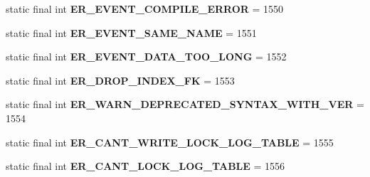 \begin{DoxyCompactItemize}
\item 
\mbox{\label{classcom_1_1mysql_1_1jdbc_1_1_mysql_error_numbers_a511e0dc3db2c2b5da860aba48781529d}} 
static final int {\bfseries E\+R\+\_\+\+E\+V\+E\+N\+T\+\_\+\+C\+O\+M\+P\+I\+L\+E\+\_\+\+E\+R\+R\+OR} = 1550
\item 
\mbox{\label{classcom_1_1mysql_1_1jdbc_1_1_mysql_error_numbers_a094979c8a34487d53efb86339be2aaa6}} 
static final int {\bfseries E\+R\+\_\+\+E\+V\+E\+N\+T\+\_\+\+S\+A\+M\+E\+\_\+\+N\+A\+ME} = 1551
\item 
\mbox{\label{classcom_1_1mysql_1_1jdbc_1_1_mysql_error_numbers_a20d04b560d57ee2e45faccdf89b264ea}} 
static final int {\bfseries E\+R\+\_\+\+E\+V\+E\+N\+T\+\_\+\+D\+A\+T\+A\+\_\+\+T\+O\+O\+\_\+\+L\+O\+NG} = 1552
\item 
\mbox{\label{classcom_1_1mysql_1_1jdbc_1_1_mysql_error_numbers_adfa2826ddeb11c6e186eb67441a0e1d2}} 
static final int {\bfseries E\+R\+\_\+\+D\+R\+O\+P\+\_\+\+I\+N\+D\+E\+X\+\_\+\+FK} = 1553
\item 
\mbox{\label{classcom_1_1mysql_1_1jdbc_1_1_mysql_error_numbers_ad68e9d92df7550e11f4261f716b84c0a}} 
static final int {\bfseries E\+R\+\_\+\+W\+A\+R\+N\+\_\+\+D\+E\+P\+R\+E\+C\+A\+T\+E\+D\+\_\+\+S\+Y\+N\+T\+A\+X\+\_\+\+W\+I\+T\+H\+\_\+\+V\+ER} = 1554
\item 
\mbox{\label{classcom_1_1mysql_1_1jdbc_1_1_mysql_error_numbers_aca41c04c1cbf53cfefc8da3e2a2b6693}} 
static final int {\bfseries E\+R\+\_\+\+C\+A\+N\+T\+\_\+\+W\+R\+I\+T\+E\+\_\+\+L\+O\+C\+K\+\_\+\+L\+O\+G\+\_\+\+T\+A\+B\+LE} = 1555
\item 
\mbox{\label{classcom_1_1mysql_1_1jdbc_1_1_mysql_error_numbers_a3c42e8468e8d4651877ab82e41b81d75}} 
static final int {\bfseries E\+R\+\_\+\+C\+A\+N\+T\+\_\+\+L\+O\+C\+K\+\_\+\+L\+O\+G\+\_\+\+T\+A\+B\+LE} = 1556
\item 
\mbox{\label{classcom_1_1mysql_1_1jdbc_1_1_mysql_error_numbers_ad31a8e35dac3fd6f450b1cc3b5f765e7}} 

\end{DoxyCompactItemize}
